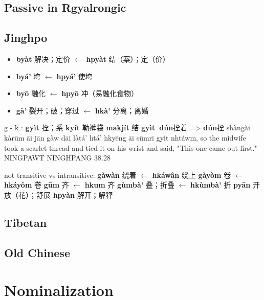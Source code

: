 \documentclass[oneside,a4paper,11pt]{article}
\newcommand{\ipa}[1]{\textbf{{\phon\mbox{#1}}}} %
\newcommand{\zh}[1]{{\cn #1}}
\begin{document}
\subsection{Passive in Rgyalrongic}
 
 
 \subsection{Jinghpo}
 \citet[78]{dai92yufa}
\begin{itemize}
\item \ipa{byàt} \zh{解决；定价} $\leftarrow$ \ipa{hpyàt} \zh{结（案）；定（价）}
\item \ipa{byá'} \zh{垮} $\leftarrow$ \ipa{hpyá'} \zh{使垮} %
\item \ipa{byō} \zh{融化} $\leftarrow$ \ipa{hpyō} \zh{冲（易融化食物）} 
\item \ipa{gà'} \zh{裂开；破；穿过} $\leftarrow$ \ipa{hkà'} \zh{分离；离婚} 
\end{itemize}

g - k : 
  \ipa{gyìt} \zh{拴；系}  \ipa{kyít}   \zh{勒裤袋}
  \ipa{makjít} \zh{结} 
    \ipa{gyìt dún}\zh{拴着} =>  \ipa{dún}\zh{拴}
shàngài kàrūm āi jān gàw dāi làtá' htá' hkyēng āi sūmrī gyìt nhtáwm, 
so the midwife took a scarlet thread and tied it on his wrist and said, "This one came out first."
NINGPAWT NINGHPANG 38.28

not transitive vs intransitive:
 \ipa{gàwàn} \zh{绕着} $\leftarrow$ \ipa{hkáwân} \zh{绕上} %
 \ipa{gàyòm} \zh{卷} $\leftarrow$ \ipa{hkáyôm} \zh{卷} %
 \ipa{gūm} \zh{齐} $\leftarrow$ \ipa{hkum} \zh{齐} %
  \ipa{gùmbà'} \zh{叠；折叠} $\leftarrow$ \ipa{hkùmbà'} \zh{折} 
\ipa{pyān} \zh{开放（花）；舒展}  \ipa{hpyàn} \zh{解开；解释} %

\subsection{Tibetan}
\subsection{Old Chinese}
\section{Nominalization}
\end{document}
